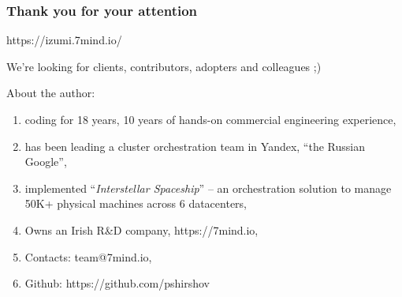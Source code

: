 \documentclass[usenames,dvipsnames]{beamer}
\begin{document}
\begin{frame}
    \frametitle{Thank you for your attention}

    \begin{center}
      https://izumi.7mind.io/

      We're looking for clients, contributors, adopters and colleagues ;)
    \end{center}

    About the author:
    \begin{enumerate}
        \item coding for 18 years, 10 years of hands-on commercial engineering experience,
        \item has been leading a cluster orchestration team in Yandex, ``the Russian Google'',
        \item implemented ``\textit{Interstellar Spaceship}'' -- an orchestration solution to manage 50K+ physical machines across 6 datacenters,
        \item Owns an Irish R\&D company, https://7mind.io,
        \item Contacts: team@7mind.io,
        \item Github: https://github.com/pshirshov
    \end{enumerate}
\end{frame}
\end{document}

